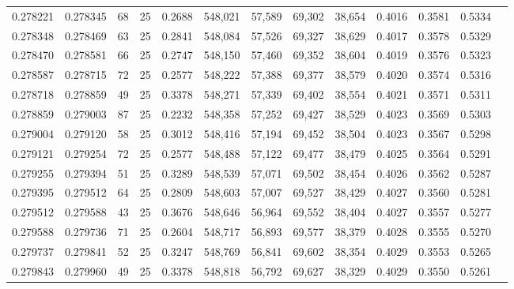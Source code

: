 \begin{tabular}{rrrrrrrrrrrrr}
0.278221 & 0.278345 &    68 &  25 &                                     0.2688 & 548,021 &  57,589 &  69,302 &  38,654 & 0.4016 & 0.3581 & 0.5334 \\
0.278348 & 0.278469 &    63 &  25 &                                     0.2841 & 548,084 &  57,526 &  69,327 &  38,629 & 0.4017 & 0.3578 & 0.5329 \\
0.278470 & 0.278581 &    66 &  25 &                                     0.2747 & 548,150 &  57,460 &  69,352 &  38,604 & 0.4019 & 0.3576 & 0.5323 \\
0.278587 & 0.278715 &    72 &  25 &                                     0.2577 & 548,222 &  57,388 &  69,377 &  38,579 & 0.4020 & 0.3574 & 0.5316 \\
0.278718 & 0.278859 &    49 &  25 &                                     0.3378 & 548,271 &  57,339 &  69,402 &  38,554 & 0.4021 & 0.3571 & 0.5311 \\
0.278859 & 0.279003 &    87 &  25 &                                     0.2232 & 548,358 &  57,252 &  69,427 &  38,529 & 0.4023 & 0.3569 & 0.5303 \\
0.279004 & 0.279120 &    58 &  25 &                                     0.3012 & 548,416 &  57,194 &  69,452 &  38,504 & 0.4023 & 0.3567 & 0.5298 \\
0.279121 & 0.279254 &    72 &  25 &                                     0.2577 & 548,488 &  57,122 &  69,477 &  38,479 & 0.4025 & 0.3564 & 0.5291 \\
0.279255 & 0.279394 &    51 &  25 &                                     0.3289 & 548,539 &  57,071 &  69,502 &  38,454 & 0.4026 & 0.3562 & 0.5287 \\
0.279395 & 0.279512 &    64 &  25 &                                     0.2809 & 548,603 &  57,007 &  69,527 &  38,429 & 0.4027 & 0.3560 & 0.5281 \\
0.279512 & 0.279588 &    43 &  25 &                                     0.3676 & 548,646 &  56,964 &  69,552 &  38,404 & 0.4027 & 0.3557 & 0.5277 \\
0.279588 & 0.279736 &    71 &  25 &                                     0.2604 & 548,717 &  56,893 &  69,577 &  38,379 & 0.4028 & 0.3555 & 0.5270 \\
0.279737 & 0.279841 &    52 &  25 &                                     0.3247 & 548,769 &  56,841 &  69,602 &  38,354 & 0.4029 & 0.3553 & 0.5265 \\
0.279843 & 0.279960 &    49 &  25 &                                     0.3378 & 548,818 &  56,792 &  69,627 &  38,329 & 0.4029 & 0.3550 & 0.5261 \\

\end{tabular}
